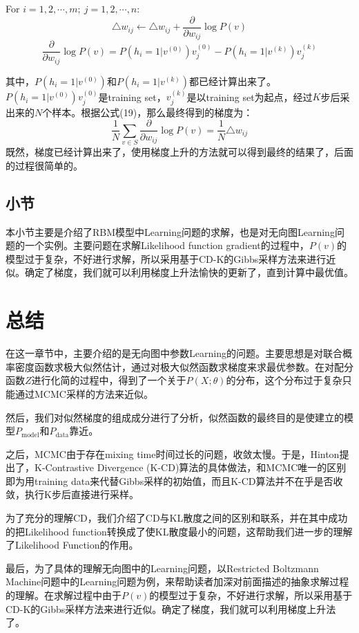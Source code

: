 \documentclass[a4paper]{article}
\begin{document}
\qquad For  $i=1,2,\cdots,m;\ j=1,2,\cdots,n$:
$$
\triangle w_{ij} \longleftarrow \triangle w_{ij} + \frac{\partial}{\partial w_{ij}} \log P(v)
$$
$$
\frac{\partial}{\partial w_{ij}} \log P(v) = P(h_i=1|v^{(0)}) v_j^{(0)} - P(h_i=1|v^{(k)})v_j^{(k)}
$$

其中，$P(h_i=1|v^{(0)})$和$P(h_i=1|v^{(k)})$都已经计算出来了。$P(h_i=1|v^{(0)}) v_j^{(0)}$是training set，$v_j^{(k)}$是以training set为起点，经过$K$步后采出来的$N$个样本。根据公式(19)，那么最终得到的梯度为：
\begin{equation}
    \frac{1}{N} \sum_{v\in S} \frac{\partial}{\partial w_{ij}} \log P(v) = \frac{1}{N} \triangle w_{ij}
\end{equation}
既然，梯度已经计算出来了，使用梯度上升的方法就可以得到最终的结果了，后面的过程很简单的。

\subsection{小节}
本小节主要是介绍了RBM模型中Learning问题的求解，也是对无向图Learning问题的一个实例。主要问题在求解Likelihood function gradient的过程中，$P(v)$的模型过于复杂，不好进行求解，所以采用基于CD-K的Gibbs采样方法来进行近似。确定了梯度，我们就可以利用梯度上升法愉快的更新了，直到计算中最优值。

\section{总结}
在这一章节中，主要介绍的是无向图中参数Learning的问题。主要思想是对联合概率密度函数求极大似然估计，通过对极大似然函数求梯度来求最优参数。在对配分函数$Z$进行化简的过程中，得到了一个关于$P(X;\theta)$的分布，这个分布过于复杂只能通过MCMC采样的方法来近似。

然后，我们对似然梯度的组成成分进行了分析，似然函数的最终目的是使建立的模型$P_{\mathrm{model}}$和$P_{\mathrm{data}}$靠近。

之后，MCMC由于存在mixing time时间过长的问题，收敛太慢。于是，Hinton提出了，K-Contrastive Divergence (K-CD)算法的具体做法，和MCMC唯一的区别即为用training data来代替Gibbs采样的初始值，而且K-CD算法并不在乎是否收敛，执行K步后直接进行采样。

为了充分的理解CD，我们介绍了CD与KL散度之间的区别和联系，并在其中成功的把Likelihood function转换成了使KL散度最小的问题，这帮助我们进一步的理解了Likelihood Function的作用。

最后，为了具体的理解无向图中的Learning问题，以Restricted Boltzmann Machine问题中的Learning问题为例，来帮助读者加深对前面描述的抽象求解过程的理解。在求解过程中由于$P(v)$的模型过于复杂，不好进行求解，所以采用基于CD-K的Gibbs采样方法来进行近似。确定了梯度，我们就可以利用梯度上升法了。
\end{document}
